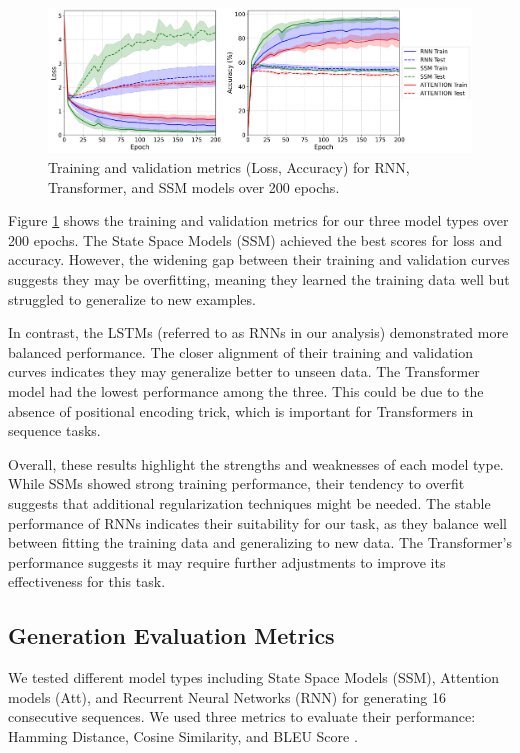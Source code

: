 \documentclass[10pt,a4paper]{article}
\begin{document}
\begin{figure}[htbp]
\centering
\includegraphics[width=\textwidth]{training_results.png}
\caption{Training and validation metrics (Loss, Accuracy) for RNN, Transformer, and SSM models over 200 epochs.}
\label{fig:training_results}
\end{figure}

Figure \ref{fig:training_results} shows the training and validation metrics for our three model types over 200 epochs. The State Space Models (SSM) achieved the best scores for loss and accuracy. However, the widening gap between their training and validation curves suggests they may be overfitting, meaning they learned the training data well but struggled to generalize to new examples.

In contrast, the LSTMs (referred to as RNNs in our analysis) demonstrated more balanced performance. The closer alignment of their training and validation curves indicates they may generalize better to unseen data. The Transformer model had the lowest performance among the three. This could be due to the absence of positional encoding trick, which is important for Transformers in sequence tasks.

Overall, these results highlight the strengths and weaknesses of each model type. While SSMs showed strong training performance, their tendency to overfit suggests that additional regularization techniques might be needed. The stable performance of RNNs indicates their suitability for our task, as they balance well between fitting the training data and generalizing to new data. The Transformer's performance suggests it may require further adjustments to improve its effectiveness for this task.

\subsection{Generation Evaluation Metrics}

We tested different model types including State Space Models (SSM), Attention models (Att), and Recurrent Neural Networks (RNN) for generating 16 consecutive sequences. We used three metrics to evaluate their performance: Hamming Distance, Cosine Similarity, and BLEU Score \cite{sutskever2014sequence, hamming1950error, papineni2002bleu}.
\end{document}
